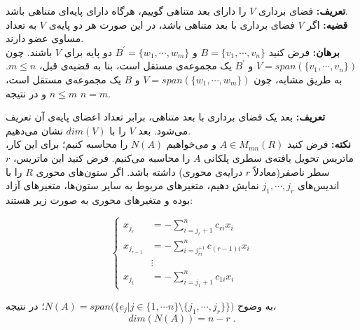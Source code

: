 \textbf{تعریف:}
فضا‌ی برداری $V$ را دارای بعد متناهی گوییم، هرگاه دارا‌ی پایه‌ای متناهی باشد.\\
\textbf{قضیه:}
اگر $V$ فضا‌ی برداری با بعد متناهی باشد، در این صورت هر دو پایه‌ی $V$ به تعداد مساوی عضو دارند.\\
\textbf{برهان:}
فرض کنید $B=\{v_1,\cdots, v_n\}$ و $B^{\prime}=\{w_1,\cdots,w_m\}$ دو پایه برای $V$ باشند. چون $V = span(\{v_1,\cdots,v_n\})$ و $B^{\prime}$ یک مجموعه‌ی مستقل است، بنا به قضیه‌ی قبل، $m\leq n$. به طریق مشابه، چون  $V = span(\{w_1,\cdots,w_m\})$ و $B$ یک مجموعه‌ی مستقل است، $n\leq m$ و در نتیجه $n=m$.

\textbf{تعریف:}
بعد یک فضا‌ی برداری با بعد متناهی، برابر تعداد اعضا‌ی پایه‌ی آن تعریف می‌شود. بعد $V$ را با $dim(V)$ نشان می‌دهیم.\\
\textbf{نکته:}
فرض کنید $A\in M_{mn}(R)$ و می‌خواهیم $N(A)$ را محاسبه کنیم؛ برای این کار، ماتریس تحویل یافته‌ی سطری پلکانی $A$ را محاسبه می‌کنیم. فرض کنید این ماتریس، $r$ سطر ناصفر(معادلاً $r$ درایه‌ی محوری) داشته باشد. اگر ستون‌های محوری  $R$ را با اندیس‌های $j_1,\cdots,j_r$ نمایش دهیم، متغیر‌های مربوط به سایر ستون‌ها، متغیر‌های آزاد بوده و متغیر‌های محوری به صورت زیر هستند:

\begin{equation}
\left\{\begin{aligned}
x_{j_{r}} &=-\sum_{i=j_{r}+1}^{n} c_{r i} x_{i} \\
x_{j_{r-1}} &=-\sum_{i=j_{r i}^{+1}}^{n} c_{(r-1) i} x_{i} \\
& \vdots \\
x_{j_1} &=-\sum_{i=j_{1}+1}^{n} c_{1 i} x_{i}
\end{aligned}\right.
\end{equation}

به وضوح $N(A) = span\Big(\bigg\{e_j|j\in\{1,\cdots n\}\setminus\{j_1,\cdots,j_r\}\bigg\}\Big)$؛ در نتیجه،
$$dim (N(A)) = n-r \; .$$